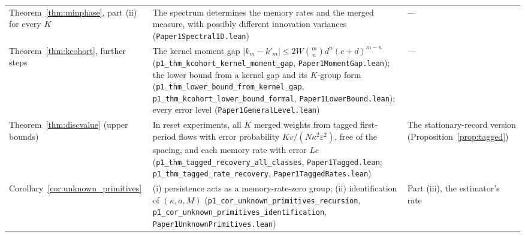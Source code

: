 \begin{longtable}{>{\raggedright\arraybackslash}p{}>{\raggedright\arraybackslash}p{}>{\raggedright\arraybackslash}p{}}
Theorem~\ref{thm:minphase}, part (ii) for every $K$ & The spectrum determines the memory rates and the merged measure, with possibly different innovation variances (\nolinkurl{Paper1SpectralID.lean}) & ---\\
Theorem~\ref{thm:kcohort}, further steps & The kernel moment gap $|k_m-k'_m|\le2W\binom mn d^n(c+d)^{m-n}$ (\nolinkurl{p1_thm_kcohort_kernel_moment_gap}, \nolinkurl{Paper1MomentGap.lean}); the lower bound from a kernel gap and its $K$-group form (\nolinkurl{p1_thm_lower_bound_from_kernel_gap}, \nolinkurl{p1_thm_kcohort_lower_bound_formal}, \nolinkurl{Paper1LowerBound.lean}); every error level (\nolinkurl{Paper1GeneralLevel.lean}) & ---\\
Theorem~\ref{thm:discvalue} (upper bounds) & In reset experiments, all $K$ merged weights from tagged first-period flows with error probability $Kv/(N\kappa^2\varepsilon^2)$, free of the spacing, and each memory rate with error $Le$ (\nolinkurl{p1_thm_tagged_recovery_all_classes}, \nolinkurl{Paper1Tagged.lean}; \nolinkurl{p1_thm_tagged_rate_recovery}, \nolinkurl{Paper1TaggedRates.lean}) & The stationary-record version (Proposition~\ref{prop:tagged})\\
Corollary~\ref{cor:unknown_primitives} & (i) persistence acts as a memory-rate-zero group; (ii) identification of $(\kappa,a,M)$ (\nolinkurl{p1_cor_unknown_primitives_recursion}, \nolinkurl{p1_cor_unknown_primitives_identification}, \nolinkurl{Paper1UnknownPrimitives.lean}) & Part (iii), the estimator's rate\\
\bottomrule
\end{longtable}
